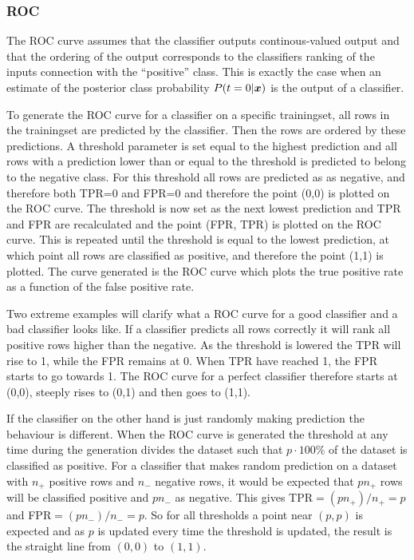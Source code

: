\subsubsection{ROC}
The ROC curve assumes that the classifier outputs continous-valued output and that the ordering of the output corresponds to the classifiers ranking of the inputs connection with the ``positive'' class. This is exactly the case when an estimate of the posterior class probability $P(t=0|\boldsymbol{x})$ is the output of a classifier. \par
To generate the ROC curve for a classifier on a specific trainingset, all rows in the trainingset are predicted by the classifier. Then the rows are ordered by these predictions. A threshold parameter is set equal to the highest prediction and all rows with a prediction lower than or equal to the threshold is predicted to belong to the negative class. For this threshold all rows are predicted as as negative, and therefore both TPR=0 and FPR=0 and therefore the point (0,0) is plotted on the ROC curve. The threshold is now set as the next lowest prediction and TPR and FPR are recalculated and the point (FPR, TPR) is plotted on the ROC curve. This is repeated until the threshold is equal to the lowest prediction, at which point all rows are classified as positive, and therefore the point (1,1) is plotted. The curve generated is the ROC curve which plots the true positive rate as a function of the false positive rate. \par
Two extreme examples will clarify what a ROC curve for a good classifier and a bad classifier looks like. If a classifier predicts all rows correctly it will rank all positive rows higher than the negative. As the threshold is lowered the TPR will rise to 1, while the FPR remains at 0. When TPR have reached 1, the FPR starts to go towards 1. The ROC curve for a perfect classifier therefore starts at (0,0), steeply rises to (0,1) and then goes to (1,1). \par
If the classifier on the other hand is just randomly making prediction the behaviour is different. When the ROC curve is generated the threshold at any time during the generation divides the dataset such that $p\cdot 100\%$ of the dataset is classified as positive. For a classifier that makes random prediction on a dataset with $n_+$ positive rows and $n_-$ negative rows, it would be expected that $pn_+$ rows will be classified positive and $pn_-$ as negative. This gives TPR$=(pn_+)/n_+=p$ and FPR$=(pn_-)/n_-=p$. So for all thresholds a point near $(p,p)$ is expected and as $p$ is updated every time the threshold is updated, the result is the straight line from $(0,0)$ to $(1,1)$. \par
